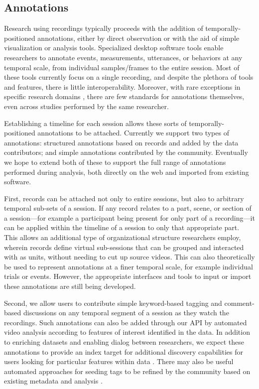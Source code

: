 \documentclass{sig-alternate}
\begin{document}
\subsection{Annotations}

Research using recordings typically proceeds with the addition of temporally-positioned annotations, either by direct observation or with the aid of simple visualization or analysis tools.
Specialized desktop software tools enable researchers to annotate events, measurements, utterances, or behaviors at any temporal scale, from individual samples/frames to the entire session.
Most of these tools currently focus on a single recording, and despite the plethora of tools and features, there is little interoperability.
Moreover, with rare exceptions in specific research domains \cite{MacWhinney2001}, there are few standards for annotations themselves, even across studies performed by the same researcher. 

Establishing a timeline for each session allows these sorts of temporally-positioned annotations to be attached.
Currently we support two types of annotations: structured annotations based on records and added by the data contributors; and simple annotations contributed by the community.
Eventually we hope to extend both of these to support the full range of annotations performed during analysis, both directly on the web and imported from existing software.

First, records can be attached not only to entire sessions, but also to arbitrary temporal sub-sets of a session.
If any record relates to a part, scene, or section of a session---for example a participant being present for only part of a recording---it can be applied within the timeline of a session to only that appropriate part.
This allows an additional type of organizational structure researchers employ, wherein records define virtual sub-sessions that can be grouped and interacted with as units, without needing to cut up source videos.
This can also theoretically be used to represent annotations at a finer temporal scale, for example individual trials or events.
However, the appropriate interfaces and tools to input or import these annotations are still being developed.

Second, we allow users to contribute simple keyword-based tagging and comment-based discussions on any temporal segment of a session as they watch the recordings.
Such annotations can also be added through our API by automated video analysis according to features of interest identified in the data.
In addition to enriching datasets and enabling dialog between researchers, we expect these annotations to provide an index target for additional discovery capabilities for users looking for particular features within data \cite{Lanagan_Smeaton_2012}.
There may also be useful automated approaches for seeding tags to be refined by the community based on existing metadata and analysis \cite{Yang_Lu_Giles_2011,Farooq_etal_2007,Giles2013}.
\end{document}
